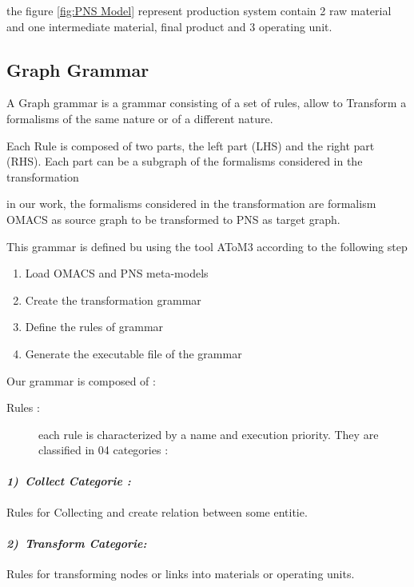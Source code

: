 the figure \ref{fig:PNS Model} represent production system contain 2 raw material and one intermediate material, final product and 3 operating unit.





\pagebreak
\subsection{Graph Grammar}
A Graph grammar is a grammar consisting of a set of rules, allow to 
Transform a formalisms of the same nature or of a different nature. 

Each Rule is composed of two parts, the left part (LHS) and the right part (RHS).
Each part can be a subgraph of the formalisms considered in the transformation

in our work, the formalisms considered in the transformation are formalism
OMACS as source graph to be transformed to PNS as target graph.

This grammar is defined bu using the tool AToM3 according to the following step

\begin{enumerate}
	\item Load OMACS and PNS meta-models
	\item Create the transformation grammar
	\item Define the rules of grammar
	\item Generate the executable file of the grammar
\end{enumerate}

Our grammar is composed of :
\begin{description}
	\item [{Rules :}] each rule is characterized
	by a name and execution priority. They are classified in 04 categories :
\end{description}


\paragraph{\emph{1)~Collect Categorie :} } 
Rules for Collecting and create relation between some entitie.
 
\paragraph{\emph{2)~Transform Categorie:} } 
Rules for transforming nodes or links into materials or operating units.
 

